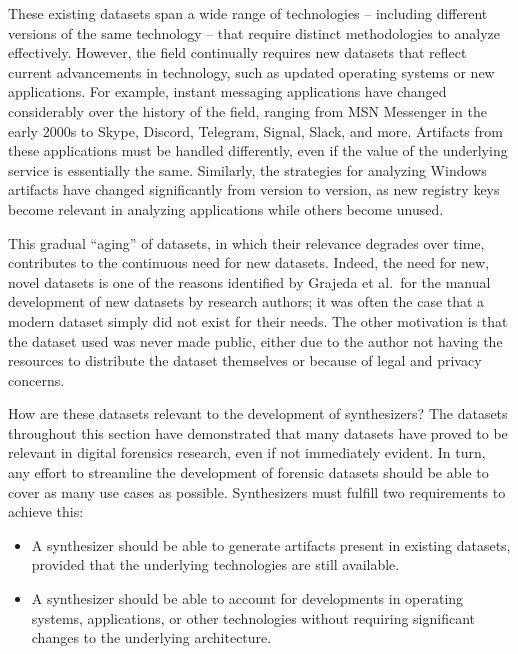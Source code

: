\documentclass[letterpaper,12pt]{report}
\def\tightlist{}
\begin{document}
These existing datasets span a wide range of technologies -- including
different versions of the same technology -- that require distinct
methodologies to analyze effectively. However, the field continually
requires new datasets that reflect current advancements in technology,
such as updated operating systems or new applications. For example,
instant messaging applications have changed considerably over the
history of the field, ranging from MSN Messenger in the early 2000s to
Skype, Discord, Telegram, Signal, Slack, and more. Artifacts from these
applications must be handled differently, even if the value of the
underlying service is essentially the same. Similarly, the strategies
for analyzing Windows artifacts have changed significantly from version
to version, as new registry keys become relevant in analyzing
applications while others become unused.

This gradual ``aging'' of datasets, in which their relevance degrades
over time, contributes to the continuous need for new datasets. Indeed,
the need for new, novel datasets is one of the reasons identified by
Grajeda et al.~for the manual development of new datasets by research
authors; it was often the case that a modern dataset simply did not
exist for their needs. The other motivation is that the dataset used was
never made public, either due to the author not having the resources to
distribute the dataset themselves or because of legal and privacy
concerns.

How are these datasets relevant to the development of synthesizers? The
datasets throughout this section have demonstrated that many datasets
have proved to be relevant in digital forensics research, even if not
immediately evident. In turn, any effort to streamline the development
of forensic datasets should be able to cover as many use cases as
possible. Synthesizers must fulfill two requirements to achieve this:

\begin{itemize}
\tightlist
\item
  A synthesizer should be able to generate artifacts present in existing
  datasets, provided that the underlying technologies are still
  available.
\item
  A synthesizer should be able to account for developments in operating
  systems, applications, or other technologies without requiring
  significant changes to the underlying architecture.
\end{itemize}
\end{document}
